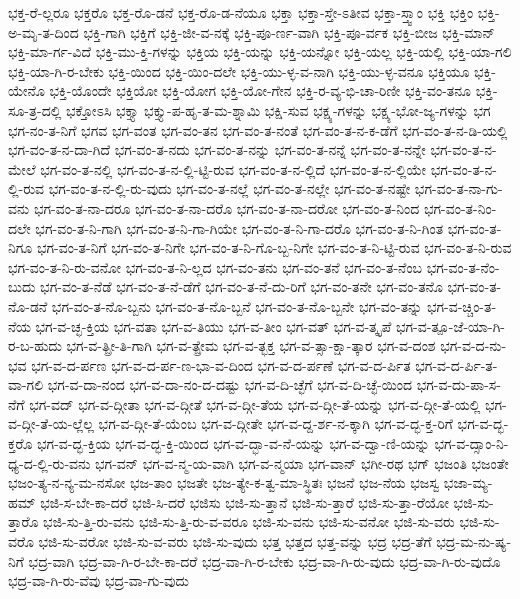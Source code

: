 {ಭಕ್ತ-ರೆ-ಲ್ಲರೂ
ಭಕ್ತರೊ
ಭಕ್ತ-ರೊ-ಡನೆ
ಭಕ್ತ-ರೊ-ಡ-ನೆಯೂ
ಭಕ್ತಾ
ಭಕ್ತಾ-ಸ್ತೇ-ಽತೀವ
ಭಕ್ತಾ-ಸ್ತ್ವಾಂ
ಭಕ್ತಿ
ಭಕ್ತಿಂ
ಭಕ್ತಿ-ಅ-ಮೃ-ತ-ದಿಂದ
ಭಕ್ತಿ-ಗಾಗಿ
ಭಕ್ತಿಗೆ
ಭಕ್ತಿ-ಜೀ-ವ-ನಕ್ಕೆ
ಭಕ್ತಿ-ಪೂ-ರ್ಣ-ವಾಗಿ
ಭಕ್ತಿ-ಪೂ-ರ್ವಕ
ಭಕ್ತಿ-ಬೀಜ
ಭಕ್ತಿ-ಮಾನ್
ಭಕ್ತಿ-ಮಾ-ರ್ಗ-ವಿದೆ
ಭಕ್ತಿ-ಮು-ಕ್ತಿ-ಗಳನ್ನು
ಭಕ್ತಿಯ
ಭಕ್ತಿ-ಯನ್ನು
ಭಕ್ತಿ-ಯನ್ನೋ
ಭಕ್ತಿ-ಯಲ್ಲ
ಭಕ್ತಿ-ಯಲ್ಲಿ
ಭಕ್ತಿ-ಯಾ-ಗಲಿ
ಭಕ್ತಿ-ಯಾ-ಗಿ-ರ-ಬೇಕು
ಭಕ್ತಿ-ಯಿಂದ
ಭಕ್ತಿ-ಯಿಂ-ದಲೇ
ಭಕ್ತಿ-ಯು-ಳ್ಳ-ವ-ನಾಗಿ
ಭಕ್ತಿ-ಯು-ಳ್ಳ-ವನೂ
ಭಕ್ತಿಯೂ
ಭಕ್ತಿ-ಯೇನೊ
ಭಕ್ತಿ-ಯೊಂದೇ
ಭಕ್ತಿಯೋ
ಭಕ್ತಿ-ಯೋಗ
ಭಕ್ತಿ-ಯೋ-ಗೇನ
ಭಕ್ತಿ-ರ-ವ್ಯ-ಭಿ-ಚಾ-ರಿಣೀ
ಭಕ್ತಿ-ವಂ-ತನೂ
ಭಕ್ತಿ-ಸೂ-ತ್ರ-ದಲ್ಲಿ
ಭಕ್ತೋಽಸಿ
ಭಕ್ತ್ಯಾ
ಭಕ್ತ್ಯು-ಪ-ಹೃ-ತ-ಮ-ಶ್ನಾಮಿ
ಭಕ್ಷಿ-ಸುವ
ಭಕ್ಷ್ಯ-ಗಳನ್ನು
ಭಕ್ಷ್ಯ-ಭೋ-ಜ್ಯ-ಗಳನ್ನು
ಭಗ
ಭಗ-ನಂ-ತ-ನಿಗೆ
ಭಗವ
ಭಗ-ವಂತ
ಭಗ-ವಂ-ತನ
ಭಗ-ವಂ-ತ-ನಂತೆ
ಭಗ-ವಂ-ತ-ನ-ಕ-ಡೆಗೆ
ಭಗ-ವಂ-ತ-ನ-ಡಿ-ಯಲ್ಲಿ
ಭಗ-ವಂ-ತ-ನ-ದಾ-ಗಿದೆ
ಭಗ-ವಂ-ತ-ನದು
ಭಗ-ವಂ-ತ-ನನ್ನು
ಭಗ-ವಂ-ತ-ನನ್ನೆ
ಭಗ-ವಂ-ತ-ನನ್ನೇ
ಭಗ-ವಂ-ತ-ನ-ಮೇಲೆ
ಭಗ-ವಂ-ತ-ನಲ್ಲಿ
ಭಗ-ವಂ-ತ-ನ-ಲ್ಲಿ-ಟ್ಟಿ-ರುವ
ಭಗ-ವಂ-ತ-ನ-ಲ್ಲಿದೆ
ಭಗ-ವಂ-ತ-ನ-ಲ್ಲಿಯೇ
ಭಗ-ವಂ-ತ-ನ-ಲ್ಲಿ-ರುವ
ಭಗ-ವಂ-ತ-ನ-ಲ್ಲಿ-ರು-ವುದು
ಭಗ-ವಂ-ತ-ನಲ್ಲೆ
ಭಗ-ವಂ-ತ-ನಲ್ಲೇ
ಭಗ-ವಂ-ತ-ನಷ್ಟೇ
ಭಗ-ವಂ-ತ-ನಾ-ಗು-ವನು
ಭಗ-ವಂ-ತ-ನಾ-ದರೂ
ಭಗ-ವಂ-ತ-ನಾ-ದರೊ
ಭಗ-ವಂ-ತ-ನಾ-ದರೋ
ಭಗ-ವಂ-ತ-ನಿಂದ
ಭಗ-ವಂ-ತ-ನಿಂ-ದಲೇ
ಭಗ-ವಂ-ತ-ನಿ-ಗಾಗಿ
ಭಗ-ವಂ-ತ-ನಿ-ಗಾ-ಗಿಯೇ
ಭಗ-ವಂ-ತ-ನಿ-ಗಾ-ದರೊ
ಭಗ-ವಂ-ತ-ನಿ-ಗಿಂತ
ಭಗ-ವಂ-ತ-ನಿಗೂ
ಭಗ-ವಂ-ತ-ನಿಗೆ
ಭಗ-ವಂ-ತ-ನಿಗೇ
ಭಗ-ವಂ-ತ-ನಿ-ಗೊ-ಬ್ಬ-ನಿಗೇ
ಭಗ-ವಂ-ತ-ನಿ-ಟ್ಟಿ-ರುವ
ಭಗ-ವಂ-ತ-ನಿ-ರುವ
ಭಗ-ವಂ-ತ-ನಿ-ರು-ವನೋ
ಭಗ-ವಂ-ತ-ನಿ-ಲ್ಲದ
ಭಗ-ವಂ-ತನು
ಭಗ-ವಂ-ತನೆ
ಭಗ-ವಂ-ತ-ನೆಂಬ
ಭಗ-ವಂ-ತ-ನೆಂ-ಬುದು
ಭಗ-ವಂ-ತ-ನೆಡೆ
ಭಗ-ವಂ-ತ-ನೆ-ಡೆಗೆ
ಭಗ-ವಂ-ತ-ನೆ-ದು-ರಿಗೆ
ಭಗ-ವಂ-ತನೇ
ಭಗ-ವಂ-ತನೊ
ಭಗ-ವಂ-ತ-ನೊ-ಡನೆ
ಭಗ-ವಂ-ತ-ನೊ-ಬ್ಬನು
ಭಗ-ವಂ-ತ-ನೊ-ಬ್ಬನೆ
ಭಗ-ವಂ-ತ-ನೊ-ಬ್ಬನೇ
ಭಗ-ವಂ-ತನ್ನು
ಭಗ-ವ-ಚ್ಚಿಂ-ತ-ನೆಯ
ಭಗ-ವ-ಚ್ಛ-ಕ್ತಿಯ
ಭಗ-ವತಾ
ಭಗ-ವ-ತಿಯು
ಭಗ-ವ-ತೀಂ
ಭಗ-ವತ್
ಭಗ-ವ-ತ್ಕೃಪೆ
ಭಗ-ವ-ತ್ಪೂ-ಜೆ-ಯಾ-ಗಿ-ರ-ಬ-ಹುದು
ಭಗ-ವ-ತ್ಪ್ರೀ-ತಿ-ಗಾಗಿ
ಭಗ-ವ-ತ್ಪ್ರೇಮ
ಭಗ-ವ-ತ್ಭಕ್ತ
ಭಗ-ವ-ತ್ಸಾ-ಕ್ಷಾ-ತ್ಕಾರ
ಭಗ-ವ-ದಂಶ
ಭಗ-ವ-ದ-ನು-ಭವ
ಭಗ-ವ-ದ-ರ್ಪಣ
ಭಗ-ವ-ದ-ರ್ಪ-ಣ-ಭಾ-ವ-ದಿಂದ
ಭಗ-ವ-ದ-ರ್ಪಣೆ
ಭಗ-ವ-ದ-ರ್ಪಿತ
ಭಗ-ವ-ದ-ರ್ಪಿ-ತ-ವಾ-ಗಲಿ
ಭಗ-ವ-ದಾ-ನಂದ
ಭಗ-ವ-ದಾ-ನಂ-ದ-ದಷ್ಟು
ಭಗ-ವ-ದಿ-ಚ್ಛೆಗೆ
ಭಗ-ವ-ದಿ-ಚ್ಛೆ-ಯಿಂದ
ಭಗ-ವ-ದು-ಪಾ-ಸ-ನೆಗೆ
ಭಗ-ವದ್
ಭಗ-ವ-ದ್ಗೀತಾ
ಭಗ-ವ-ದ್ಗೀತೆ
ಭಗ-ವ-ದ್ಗೀ-ತೆಯ
ಭಗ-ವ-ದ್ಗೀ-ತೆ-ಯನ್ನು
ಭಗ-ವ-ದ್ಗೀ-ತೆ-ಯಲ್ಲಿ
ಭಗ-ವ-ದ್ಗೀ-ತೆ-ಯ-ಲ್ಲೆಲ್ಲ
ಭಗ-ವ-ದ್ಗೀ-ತೆ-ಯೆಂಬ
ಭಗ-ವ-ದ್ಗೀತೇ
ಭಗ-ವ-ದ್ದ-ರ್ಶ-ನ-ಕ್ಕಾಗಿ
ಭಗ-ವ-ದ್ಭ-ಕ್ತ-ರಿಗೆ
ಭಗ-ವ-ದ್ಭ-ಕ್ತರೊ
ಭಗ-ವ-ದ್ಭ-ಕ್ತಿಯ
ಭಗ-ವ-ದ್ಭ-ಕ್ತಿ-ಯಿಂದ
ಭಗ-ವ-ದ್ಭಾ-ವ-ನೆ-ಯನ್ನು
ಭಗ-ವ-ದ್ವಾ-ಣಿ-ಯನ್ನು
ಭಗ-ವ-ದ್ಸಾಂ-ನಿ-ಧ್ಯ-ದ-ಲ್ಲಿ-ರು-ವನು
ಭಗ-ವನ್
ಭಗ-ವ-ನ್ಮ-ಯ-ವಾಗಿ
ಭಗ-ವ-ನ್ಮಯಾ
ಭಗ-ವಾನ್
ಭಗೀ-ರಥ
ಭಗ್
ಭಜಂತಿ
ಭಜಂತೇ
ಭಜಂ-ತ್ಯ-ನ-ನ್ಯ-ಮ-ನಸೋ
ಭಜ-ತಾಂ
ಭಜತೇ
ಭಜ-ತ್ಯೇ-ಕ-ತ್ವ-ಮಾ-ಸ್ಥಿತಃ
ಭಜನೆ
ಭಜ-ನೆಯ
ಭಜಸ್ವ
ಭಜಾ-ಮ್ಯ-ಹಮ್
ಭಜಿ-ಸ-ಬೇ-ಕಾ-ದರೆ
ಭಜಿ-ಸಿ-ದರೆ
ಭಜಿಸು
ಭಜಿ-ಸು-ತ್ತಾನೆ
ಭಜಿ-ಸು-ತ್ತಾರೆ
ಭಜಿ-ಸು-ತ್ತಾ-ರೆಯೋ
ಭಜಿ-ಸು-ತ್ತಾರೊ
ಭಜಿ-ಸು-ತ್ತಿ-ರು-ವನು
ಭಜಿ-ಸು-ತ್ತಿ-ರು-ವ-ವರೂ
ಭಜಿ-ಸು-ವನು
ಭಜಿ-ಸು-ವನೋ
ಭಜಿ-ಸು-ವರು
ಭಜಿ-ಸು-ವರೊ
ಭಜಿ-ಸು-ವರೋ
ಭಜಿ-ಸು-ವ-ವರು
ಭಜಿ-ಸು-ವುದು
ಭತ್ತ
ಭತ್ತದ
ಭತ್ತ-ವನ್ನು
ಭದ್ರ
ಭದ್ರ-ತೆಗೆ
ಭದ್ರ-ಮ-ನು-ಷ್ಯ-ನಿಗೆ
ಭದ್ರ-ವಾಗಿ
ಭದ್ರ-ವಾ-ಗಿ-ರ-ಬೇ-ಕಾ-ದರೆ
ಭದ್ರ-ವಾ-ಗಿ-ರ-ಬೇಕು
ಭದ್ರ-ವಾ-ಗಿ-ರು-ವುದು
ಭದ್ರ-ವಾ-ಗಿ-ರು-ವುದೊ
ಭದ್ರ-ವಾ-ಗಿ-ರು-ವೆವು
ಭದ್ರ-ವಾ-ಗು-ವುದು
}

